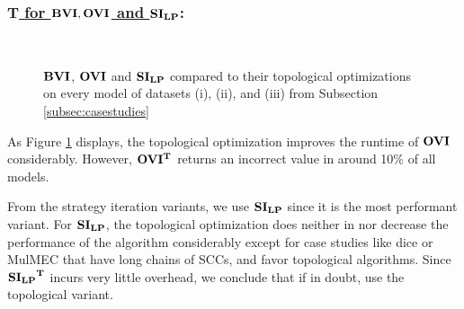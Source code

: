 \subsubsection*{\underline{$\mathbf{T}$ for $\mathbf{BVI}, \mathbf{OVI}$ and $\mathbf{SI_{LP}}$}:} \label{subsubsec:topologicalOptim}
\begin{figure}
    \centering
    \
    \caption{$\mathbf{BVI}$, $\mathbf{OVI}$ and $\mathbf{SI_{LP}}$ compared to their topological optimizations on every model of datasets (i), (ii), and (iii) from Subsection \ref{subsec:casestudies}}%
    \label{fig:Scatter_T}%
    \end{figure}
As Figure \ref{fig:Scatter_T} displays, the topological optimization improves the runtime of $\mathbf{OVI}$ considerably. 
However, $\mathbf{OVI^T}$ returns an incorrect value in around 10\% of all models.

From the strategy iteration variants, we use $\mathbf{SI_{LP}}$ since it is the most performant variant.
For $\mathbf{SI_{LP}}$, the topological optimization does neither in nor decrease the performance of the algorithm considerably except for case studies
like dice or MulMEC that have long chains of SCCs, and favor topological algorithms.
Since $\mathbf{\mathbf{SI_{LP}}^T}$ incurs very little overhead, we conclude that if in doubt, use the topological variant.


